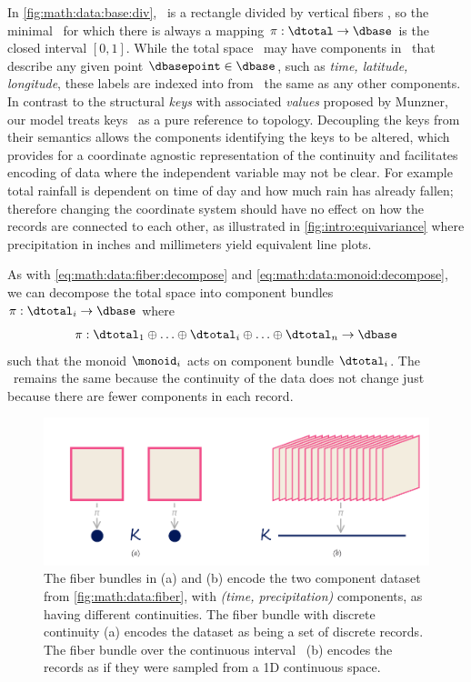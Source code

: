 \documentclass[../main.tex]{subfiles}
\begin{document}
In \autoref{fig:math:data:base:div}, \dtotal\ is a rectangle divided by vertical fibers \dfiber, so the minimal \dbase\ for which there is always a mapping \(\pi: \dtotal\rightarrow \dbase\) is the closed interval \(\left[0,1\right]\). While the total space \dtotal\ may have components in \dfiber\ that describe any given point \(\dbasepoint \in \dbase\), such as \textit{time, latitude, longitude}, these labels are indexed into from \dbase\ the same as any other components. In contrast to the structural \textit{keys} with associated \textit{values} proposed by Munzner\cite{munznerVisualizationAnalysisDesign2014}, our model treats keys \dbasepoint\ as a pure reference to topology. Decoupling the keys from their semantics allows the components identifying the keys to be altered, which provides for a coordinate agnostic representation of the continuity and facilitates encoding of data where the independent variable may not be clear. For example total rainfall is dependent on time of day and how much rain has already fallen; therefore changing the coordinate system should have no effect on how the records are connected to each other, as illustrated in \autoref{fig:intro:equivariance} where precipitation in inches and millimeters yield equivalent line plots. 

As with \autoref{eq:math:data:fiber:decompose} and \autoref{eq:math:data:monoid:decompose}, we can decompose the total space into component bundles \(\pi:\dtotal_i\rightarrow \dbase\) where
\begin{equation}
    \label{eq:math:data:base:decompose}
    \pi:\dtotal_1\oplus\ldots\oplus \dtotal_i \oplus\ldots \oplus \dtotal_n \rightarrow \dbase
\end{equation}
such that the monoid \(\monoid_{i}\) acts on component bundle \(\dtotal_i\). The \dbase\ remains the same because the continuity of the data does not change just because there are fewer components in each record.

\begin{figure}[H]
    \includegraphics[width=1\textwidth]{figures/math/base.png}
    \caption{The fiber bundles in (a) and (b) encode the two component dataset from \autoref{fig:math:data:fiber}, with \textit{(time, precipitation)} components, as having different continuities. The fiber bundle with discrete continuity (a) encodes the dataset as being a set of discrete records. The fiber bundle over the continuous interval \dbase\ (b) encodes the records as if they were sampled from a 1D continuous space.} 
    \label{fig:math:data:base}
\end{figure}
\end{document}
